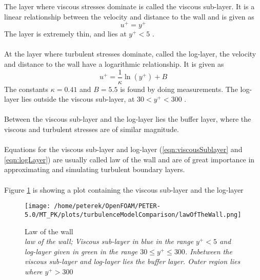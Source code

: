 \documentclass[a4paper, 12pt]{report}
\begin{document}
The layer where viscous stresses dominate is called the viscous sub-layer. It is a linear relationship between the velocity and distance to the wall and is given as \cite{CFD}
\begin{equation}
u^+ = y^+
\label{eqn:viscousSublayer}
\end{equation}
The layer is extremely thin, and lies at $y^+ < 5$ \cite{CFD}.\\
\\ 
At the layer where turbulent stresses dominate, called the log-layer, the velocity and distance to the wall have a logarithmic relationship. It is given as \cite{CFD}
\begin{equation}
u^+ = \frac{1}{\kappa}\ln(y^+) + B
\label{eqn:logLayer}
\end{equation}
The constants $\kappa = 0.41$  and $B= 5.5$ is found by doing measurements. The log-layer lies outside the viscous sub-layer, at $30 < y^+ < 300$ \cite{CFD}.\\
\\
Between the viscous sub-layer and the log-layer lies the buffer layer, where the viscous and turbulent stresses are of similar magnitude.\\
\\
Equations for the viscous sub-layer and log-layer (\ref{eqn:viscousSublayer} and  \ref{eqn:logLayer}) are usually called law of the wall and are of great importance in approximating and simulating turbulent boundary layers.\\
\\
Figure \ref{fig:lawOfTheWall} is showing a plot containing the viscous sub-layer and the log-layer
\begin{figure}[H]
	\centering
	\texttt{[image: /home/peterek/OpenFOAM/PETER-5.0/MT\_PK/plots/turbulenceModelComparison/lawOfTheWall.png]}
	\caption{Law of the wall\\ \textit{law of the wall; Viscous sub-layer in blue in the range $y^+ < 5$ and log-layer given in green in the range $30 \leq y^+ \leq 300$. Inbetween the viscous sub-layer and log-layer lies the buffer layer. Outer region lies where $y^+ > 300$}}
	\label{fig:lawOfTheWall}
\end{figure}

 
\end{document}
